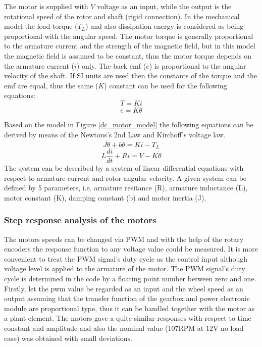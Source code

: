 \documentclass[12pt,english,twoside]{article}
\begin{document}
The motor is supplied with $V$ voltage as an input, while the output is the rotational speed of the rotor and shaft (rigid connection). In the mechanical model the load torque ($T_L$) and also dissipation energy is considered as being proportional with the angular speed. The motor torque is generally proportional to the armature current and the strength of the magnetic field, but in this model the magnetic field is assumed to be constant, thus the motor torque depends on the armature current ($i$) only. The back emf ($e$) is proportional to the angular velocity of the shaft. If SI units are used then the constants of the torque and the emf are equal, thus the same ($K$) constant can be used for the following equations: \cite{dc_motor_3}\cite{dc_motor_4}
\begin{equation}
T = K i
\end{equation}
\begin{equation}
e = K \dot \theta
\end{equation}		

Based on the model in Figure \ref{dc_motor_model} the following equations can be derived by means of the Newtons's 2nd Law and Kirchoff's voltage law.
\begin{equation}
J \ddot \theta + b \dot \theta = K i - T_L
\label{dc_eq_1}
\end{equation}
\begin{equation}
L \frac{di}{dt} + R i = V - K \dot \theta
\label{dc_eq_2}
\end{equation}
The system can be described by a system of linear differential equations with respect to armature current and rotor angular velocity. A given system can be defined by 5 parameters, i.e. armature resitance (R), armature inductance (L), motor constant (K), damping constant (b) and motor inertia (J). \newpage
\subsubsection{Step response analysis of the motors}
The motors speeds can be changed via PWM and with the help of the rotary encoders the response function to any voltage value could be measured. It is more convenient to treat the PWM signal's duty cycle as the control input although voltage level is applied to the armature of the motor. The PWM signal's duty cycle is determined in the code by a floating point number between zero and one. Firstly, let the pwm value be regarded as an input and the wheel speed as an output assuming that the transfer function of the gearbox and power electronic module are proportional type, thus it can be handled together with the motor as a plant element. 
The motors gave a quite similar responses with respect to time constant and amplitude and also the nominal value (107RPM at 12V no load case) was obtained with small deviations. 
\end{document}
